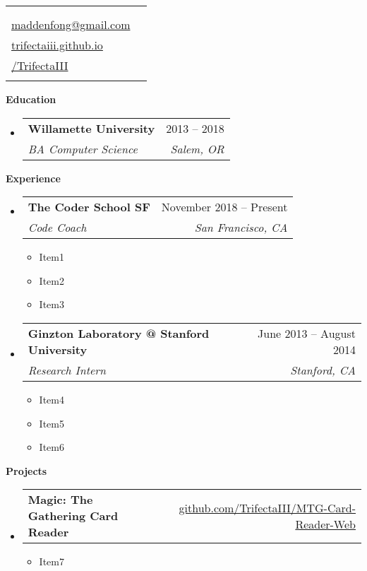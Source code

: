 \documentclass[letterpaper,12pt]{article}[leftmargin=*]
\makeatletter
\def \fullname {Dakota Madden-Fong}
\def \subtitle {}
\def \linkedinicon {\faLinkedin}
\def \linkedinlink {https://www.linkedin.com/in/dakota-madden-fong/}
\def \linkedintext {/dakota-madden-fong}
\def \phoneicon {\faPhone}
\def \phonetext {+1-415-810-0334}
\def \emailicon {\faEnvelope}
\def \emaillink {mailto:maddenfong@gmail.com}
\def \emailtext {maddenfong@gmail.com}
\def \githubicon {\faGithub}
\def \githublink {https://github.com/TrifectaIII}
\def \githubtext {/TrifectaIII}
\def \websiteicon {\faGlobe}
\def \websitelink {https://trifectaiii.github.io/}
\def \websitetext {trifectaiii.github.io}
\def \headertype {\singlecol} %
\def \entryspacing {-0pt}
\def \linkedin {\linkedinicon \hspace{3pt}\href{\linkedinlink}{\linkedintext}}
\def \phone {\phoneicon \hspace{3pt}{ \phonetext}}
\def \email {\emailicon \hspace{3pt}\href{\emaillink}{\emailtext}}
\def \github {\githubicon \hspace{3pt}\href{\githublink}{\githubtext}}
\def \website {\websiteicon \hspace{3pt}\href{\websitelink}{\websitetext}}
\renewcommand{\section}[2]{\vspace{5pt}
  \colorbox{secondary}{\color{white}\raggedbottom\normalsize\textbf{{#1}{\hspace{7pt}#2}}}
}
\newcommand{\resumeEntryStart}{\begin{itemize}[leftmargin=2.5mm]}
\newcommand{\resumeEntryEnd}{\end{itemize}\vspace{\entryspacing}}
\newcommand{\resumeItemListStart}{\begin{itemize}[leftmargin=4.5mm]}
\newcommand{\resumeItemListEnd}{\end{itemize}}
\newcommand{\resumeItem}[1]{
  \item\small{
    {#1 \vspace{-2pt}}
  }
}
\newcommand{\resumeEntryTSDL}[4]{
  \vspace{-1pt}\item[]
    \begin{tabular*}{0.97\textwidth}{l@{\extracolsep{\fill}}r}
      \textbf{\color{primary}#1} & {\firabook\color{accent}\small#2} \\
      \textit{\color{accent}\small#3} & \textit{\color{accent}\small#4} \\
    \end{tabular*}\vspace{-6pt}
}
\newcommand{\resumeEntryTD}[2]{
  \vspace{-1pt}\item[]
    \begin{tabular*}{0.97\textwidth}{l@{\extracolsep{\fill}}r}
      \textbf{\color{primary}#1} & {\firabook\color{accent}\small#2} \\
    \end{tabular*}\vspace{-6pt}
}
\newcommand{\doublecol}[6]{
  \begin{tabular*}{\textwidth}{l@{\extracolsep{\fill}}r}
    {
      \begin{tabular}[c]{l}
        \fontsize{35}{45}\selectfont{\color{primary}{{\textbf{\fullname}}}} \\
        {\textit{\subtitle}} %
      \end{tabular}
    } & {
      \begin{tabular}[c]{l@{\hspace{1.5em}}l}
        {\small#4} & {\small#1} \\
        {\small#5} & {\small#2} \\
        {\small#6} & {\small#3}
      \end{tabular}
    }
  \end{tabular*}
}
\newcommand{\singlecol}[4]{%
  \begin{tabular*}{\textwidth}{l@{\extracolsep{\fill}}r}
    {
      \begin{tabular}[b]{l}
        \fontsize{35}{45}\selectfont{\color{primary}{{\textbf{\fullname}}}} \\
        {\textit{\subtitle}} %
      \end{tabular}
    } & {
      \begin{tabular}[c]{l}
        {\small#1} \\
        {\small#2} \\
        {\small#3} \\
        {\small#4} \\
      \end{tabular}
    }
  \end{tabular*}
}
\makeatother
\begin{document}


\headertype{\phone}{\email}{\website}{\github}{}{} %
\vspace{-10pt} %

\section{\faGraduationCap}{Education}

  \resumeEntryStart
    \resumeEntryTSDL
      {Willamette University}{2013 -- 2018}
      {BA Computer Science}{Salem, OR}
  \resumeEntryEnd

\section{\faPieChart}{Experience}

  \resumeEntryStart
    \resumeEntryTSDL
      {The Coder School SF}{November 2018 -- Present}
      {Code Coach}{San Francisco, CA}
    \resumeItemListStart
      \resumeItem {Item1}
      \resumeItem {Item2}
      \resumeItem {Item3}
    \resumeItemListEnd
  \resumeEntryEnd

  \resumeEntryStart
    \resumeEntryTSDL
      {Ginzton Laboratory @ Stanford University}{June 2013 -- August 2014}
      {Research Intern}{Stanford, CA}
    \resumeItemListStart
      \resumeItem {Item4}
      \resumeItem {Item5}
      \resumeItem {Item6}
    \resumeItemListEnd
  \resumeEntryEnd


\section{\faFlask}{Projects}

  \resumeEntryStart
    \resumeEntryTD
      {Magic: The Gathering Card Reader}{\href{https://github.com/TrifectaIII/MTG-Card-Reader-Web}{github.com/TrifectaIII/MTG-Card-Reader-Web}}
    \resumeItemListStart
      \resumeItem {Item7}
    \resumeItemListEnd
  \resumeEntryEnd
\end{document}
